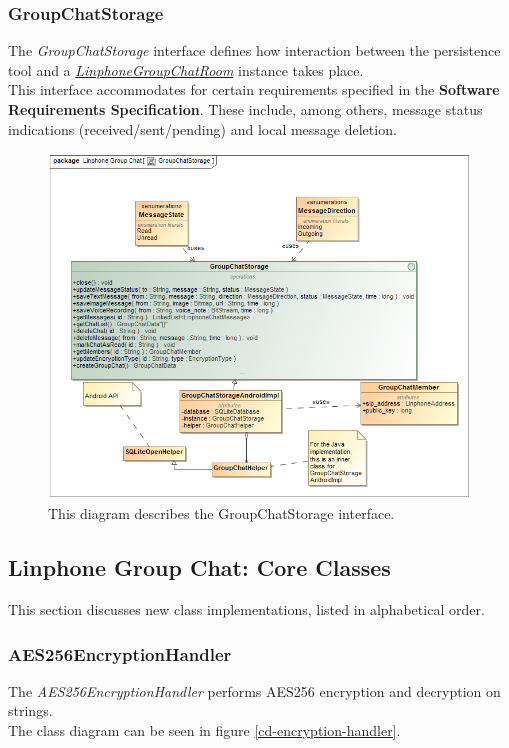 \documentclass[11pt]{article}
\begin{document}
\subsubsection{GroupChatStorage}
The \textit{GroupChatStorage} interface defines how interaction between the persistence tool and a \textit{ \hyperref[subsubsec: linphonegroupchatroom]{LinphoneGroupChatRoom}} instance takes place.\\
This interface accommodates for certain requirements specified in the \textbf{Software Requirements Specification}. These include, among others, message status indications (received/sent/pending) and local message deletion.
\begin{figure}[H]
\centering
\includegraphics[width=5in]{./images/class_chat_storage.png}
\caption[GroupChatStorage Class Diagram]{This diagram describes the GroupChatStorage interface.}
\label{cd-chat-storage}
\end{figure}
\subsection{Linphone Group Chat: Core Classes}
This section discusses new class implementations, listed in alphabetical order.
\subsubsection{AES256EncryptionHandler}
The \textit{AES256EncryptionHandler} performs AES256 encryption and decryption on strings.\\
The class diagram can be seen in figure \ref{cd-encryption-handler}.
\end{document}

